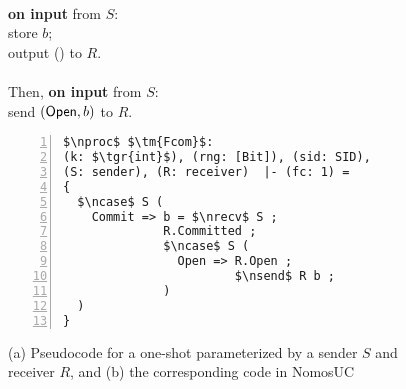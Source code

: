 \begin{figure}
\begin{minipage}{0.38\textwidth}
\begin{bbox}[title={Functionality $\F_{\m{com}}(S, R)$}]\\
\textbf{on input}  from $S$:\\
\hspace*{1em} store $b$;\\
\hspace*{1em} output () to $R$.\\ \\
Then, \textbf{on input}  from $S$:\\
\hspace*{1em} send $(\mathsf{Open}, b)$ to $R$.
\end{bbox}
\end{minipage}
\hspace{3em}
\begin{minipage}{0.5\textwidth}
\begin{lstlisting}[basicstyle=\scriptsize\BeraMonottFamily, frame=single, mathescape, numbers=left]
$\nproc$ $\tm{Fcom}$: 
(k: $\tgr{int}$), (rng: [Bit]), (sid: SID),
(S: sender), (R: receiver)  |- (fc: 1) =
{
  $\ncase$ S (
    Commit => b = $\nrecv$ S ;
              R.Committed ;
              $\ncase$ S (
                Open => R.Open ;
                        $\nsend$ R b ;
              )
  )
}
\end{lstlisting}
\end{minipage}
\caption{(a) Pseudocode for a one-shot \Fcom parameterized by a sender $S$ and receiver $R$,
and (b) the corresponding code in NomosUC}
\label{fig:fcomideal}
\vspace{-4mm}
\end{figure}
